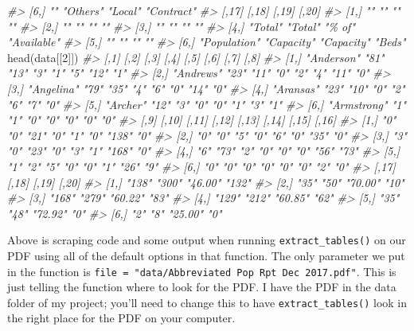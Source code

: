 \documentclass[
  12pt,
  openany]{book}
\newenvironment{Shaded}{\begin{snugshade}}{\end{snugshade}}
\newcommand{\CommentTok}[1]{\textcolor[rgb]{0.37,0.37,0.37}{\textit{#1}}}
\newcommand{\DecValTok}[1]{\textcolor[rgb]{0.06,0.06,0.06}{#1}}
\newcommand{\FunctionTok}[1]{\textcolor[rgb]{0,0,0}{#1}}
\newcommand{\NormalTok}[1]{#1}
\begin{document}
\begin{Shaded}
\begin{Highlighting}[]
\CommentTok{\#\textgreater{} [6,] ""              "Others" "Local" "Contract"}
\CommentTok{\#\textgreater{}      [,17]        [,18]      [,19]      [,20]      }
\CommentTok{\#\textgreater{} [1,] ""           ""         ""         ""         }
\CommentTok{\#\textgreater{} [2,] ""           ""         ""         ""         }
\CommentTok{\#\textgreater{} [3,] ""           ""         ""         ""         }
\CommentTok{\#\textgreater{} [4,] "Total"      "Total"    "\% of"     "Available"}
\CommentTok{\#\textgreater{} [5,] ""           ""         ""         ""         }
\CommentTok{\#\textgreater{} [6,] "Population" "Capacity" "Capacity" "Beds"}
\FunctionTok{head}\NormalTok{(data[[}\DecValTok{2}\NormalTok{]])}
\CommentTok{\#\textgreater{}      [,1]        [,2] [,3] [,4] [,5] [,6] [,7] [,8]}
\CommentTok{\#\textgreater{} [1,] "Anderson"  "81" "13" "3"  "1"  "5"  "12" "1" }
\CommentTok{\#\textgreater{} [2,] "Andrews"   "23" "11" "0"  "2"  "4"  "11" "0" }
\CommentTok{\#\textgreater{} [3,] "Angelina"  "79" "35" "4"  "6"  "0"  "14" "0" }
\CommentTok{\#\textgreater{} [4,] "Aransas"   "23" "10" "0"  "2"  "6"  "7"  "0" }
\CommentTok{\#\textgreater{} [5,] "Archer"    "12" "3"  "0"  "0"  "1"  "3"  "1" }
\CommentTok{\#\textgreater{} [6,] "Armstrong" "1"  "1"  "0"  "0"  "0"  "0"  "0" }
\CommentTok{\#\textgreater{}      [,9] [,10] [,11] [,12] [,13] [,14] [,15] [,16]}
\CommentTok{\#\textgreater{} [1,] "0"  "0"   "21"  "0"   "1"   "0"   "138" "0"  }
\CommentTok{\#\textgreater{} [2,] "0"  "0"   "5"   "0"   "6"   "0"   "35"  "0"  }
\CommentTok{\#\textgreater{} [3,] "3"  "0"   "23"  "0"   "3"   "1"   "168" "0"  }
\CommentTok{\#\textgreater{} [4,] "6"  "73"  "2"   "0"   "0"   "0"   "56"  "73" }
\CommentTok{\#\textgreater{} [5,] "1"  "2"   "5"   "0"   "0"   "1"   "26"  "9"  }
\CommentTok{\#\textgreater{} [6,] "0"  "0"   "0"   "0"   "0"   "0"   "2"   "0"  }
\CommentTok{\#\textgreater{}      [,17] [,18] [,19]   [,20]}
\CommentTok{\#\textgreater{} [1,] "138" "300" "46.00" "132"}
\CommentTok{\#\textgreater{} [2,] "35"  "50"  "70.00" "10" }
\CommentTok{\#\textgreater{} [3,] "168" "279" "60.22" "83" }
\CommentTok{\#\textgreater{} [4,] "129" "212" "60.85" "62" }
\CommentTok{\#\textgreater{} [5,] "35"  "48"  "72.92" "0"  }
\CommentTok{\#\textgreater{} [6,] "2"   "8"   "25.00" "0"}
\end{Highlighting}
\end{Shaded}

Above is scraping code and some output when running \texttt{extract\_tables()} on our PDF using all of the default options in that function. The only parameter we put in the function is \texttt{file\ =\ "data/Abbreviated\ Pop\ Rpt\ Dec\ 2017.pdf"}. This is just telling the function where to look for the PDF. I have the PDF in the data folder of my project; you'll need to change this to have \texttt{extract\_tables()} look in the right place for the PDF on your computer.
\end{document}
